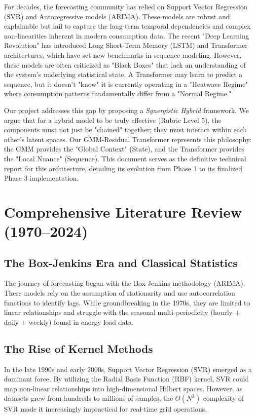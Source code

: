 \documentclass[conference]{IEEEtran}
\begin{document}
For decades, the forecasting community has relied on Support Vector Regression (SVR) and Autoregressive models (ARIMA). These models are robust and explainable but fail to capture the long-term temporal dependencies and complex non-linearities inherent in modern consumption data. The recent "Deep Learning Revolution" has introduced Long Short-Term Memory (LSTM) and Transformer architectures, which have set new benchmarks in sequence modeling. However, these models are often criticized as "Black Boxes" that lack an understanding of the system's underlying statistical state. A Transformer may learn to predict a sequence, but it doesn't "know" it is currently operating in a "Heatwave Regime" where consumption patterns fundamentally differ from a "Normal Regime."

Our project addresses this gap by proposing a \textit{Synergistic Hybrid} framework. We argue that for a hybrid model to be truly effective (Rubric Level 5), the components must not just be "chained" together; they must interact within each other's latent spaces. Our GMM-Residual Transformer represents this philosophy: the GMM provides the "Global Context" (State), and the Transformer provides the "Local Nuance" (Sequence). This document serves as the definitive technical report for this architecture, detailing its evolution from Phase 1 to its finalized Phase 3 implementation.

\section{Comprehensive Literature Review (1970--2024)}
\subsection{The Box-Jenkins Era and Classical Statistics}
The journey of forecasting began with the Box-Jenkins methodology (ARIMA). These models rely on the assumption of stationarity and use autocorrelation functions to identify lags. While groundbreaking in the 1970s, they are limited to linear relationships and struggle with the seasonal multi-periodicity (hourly + daily + weekly) found in energy load data.

\subsection{The Rise of Kernel Methods}
In the late 1990s and early 2000s, Support Vector Regression (SVR) emerged as a dominant force. By utilizing the Radial Basis Function (RBF) kernel, SVR could map non-linear relationships into high-dimensional Hilbert spaces. However, as datasets grew from hundreds to millions of samples, the $O(N^3)$ complexity of SVR made it increasingly impractical for real-time grid operations.
\end{document}
